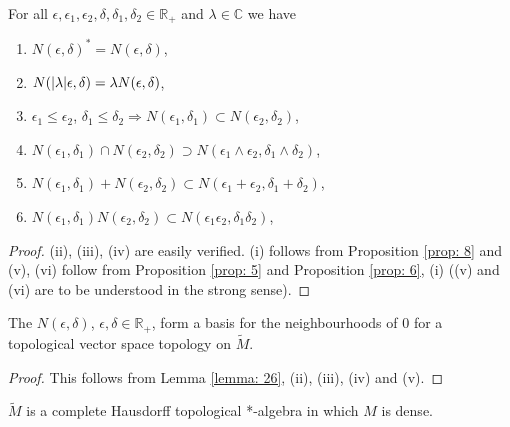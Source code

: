 \begin{lemma}\label{lemma: 26}
    For all $\epsilon,\epsilon_1,\epsilon_2,\delta,\delta_1,\delta_2\in \mathbb{R}_+$ and $\lambda\in \mathbb{C}$ we have
\begin{enumerate}
    \item $N(\epsilon,\delta)^*=N(\epsilon,\delta)$,
    \item $N(\abs{\lambda}\epsilon,\delta)=\lambda N(\epsilon,\delta)$,
    \item $\epsilon_1\leq \epsilon_2$, $\delta_1\leq \delta_2\Rightarrow N(\epsilon_1,\delta_1)\subset N(\epsilon_2,\delta_2)$,
    \item $N(\epsilon_1,\delta_1)\cap N(\epsilon_2,\delta_2)\supset N(\epsilon_1\wedge \epsilon_2,\delta_1\wedge \delta_2)$,
    \item $N(\epsilon_1,\delta_1)+N(\epsilon_2,\delta_2)\subset N(\epsilon_1+\epsilon_2,\delta_1+\delta_2)$,
    \item $N(\epsilon_1,\delta_1)N(\epsilon_2,\delta_2)\subset N(\epsilon_1\epsilon_2,\delta_1\delta_2)$,
\end{enumerate}
\end{lemma}
\begin{proof}
    (ii), (iii), (iv) are easily verified. (i) follows from Proposition \ref{prop: 8} and (v), (vi) follow from Proposition \ref{prop: 5} and Proposition \ref{prop: 6}, (i) ((v) and (vi) are to be understood in the strong sense).
\end{proof}
\begin{proposition}
    The $N(\epsilon,\delta)$, $\epsilon,\delta\in \mathbb{R}_+$, form a basis for the neighbourhoods of $0$ for a topological vector space topology on $\widetilde{M}$.
\end{proposition}
\begin{proof}
    This follows from Lemma \ref{lemma: 26}, (ii), (iii), (iv) and (v).
\end{proof}
\begin{theorem}
    $\widetilde{M}$ is a complete Hausdorff topological *-algebra in which $M$ is dense. 
\end{theorem}

